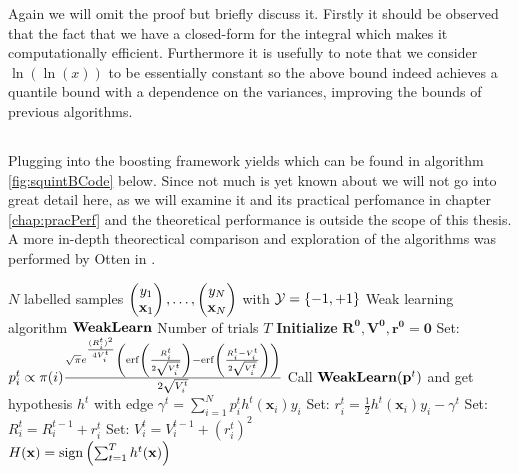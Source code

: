  Again we will omit the proof but briefly discuss it. Firstly it should be observed that the fact that we have a closed-form for the integral which makes it computationally efficient. Furthermore it is usefully to note that we consider $\ln(\ln(x))$ to be essentially constant so the above bound indeed achieves a quantile bound with a dependence on the variances, improving the bounds of previous algorithms.

\subsection{\squintB}
\label{subsec:algoSquintB}
Plugging \squint into the boosting framework yields \squintB which can be found in algorithm \ref{fig:squintBCode} below. Since not much is yet known about \squintB we will not go into great detail here, as we will examine it and its practical perfomance in chapter \ref{chap:pracPerf} and the theoretical performance is outside the scope of this thesis. A more in-depth theorectical comparison and exploration of the algorithms was performed by Otten in \cite{Otten2016}. 
\begin{algorithm} 
\caption{\NHB}
\label{fig:squintBCode}
\begin{algorithmic}[1]
\Require 
\Statex $N$ labelled samples $\Vec{y_1\\ \mathbf x_1},\ldots,\Vec{y_N\\ \mathbf x_N}$  with $\mathcal Y = \set{-1,+1}$ 
\Statex Weak learning algorithm $\weak$
\Statex Number of trials $T$
\Procedure{\squintB}{}
\State \textbf{Initialize} $\mathbf{R^0,V^0,r^0} = \mathbf 0$
\State Set: $ p_i^t \propto \pi(i) \frac{\sqrt{\pi}e^{\frac{(R^t_i)^2}{4V^t_i}}\lubke{\erf\lubke{\frac{R^t_i}{2\sqrt{V_i^t}}}-\erf\lubke{\frac{R_i^t-V_i^t}{2\sqrt{V_i^t}}}}}{2\sqrt{V_i^t}} $ 
\State Call $\weak(\mathbf p^t)$ and get hypothesis $h^t$ with edge $\gamma^t = \sum_{i=1}^N p^t_ih^t(\mathbf x_i)y_i$
\State Set: $r_i^t=\frac12h^t(\mathbf x_i)y_i-\gamma^t$ 
\State Set: $R_i^t = R_i^{t-1} + r_i^t $ 
\State Set: $V_i^t = V_i^{t-1} + (r_i^t)^2$
\EndFor\\
\Return $H(\mathbf x) = \sign\lubke{\sum^T_{t=1}h^t(\mathbf{x})}$
\EndProcedure
\end{algorithmic}
\end{algorithm}